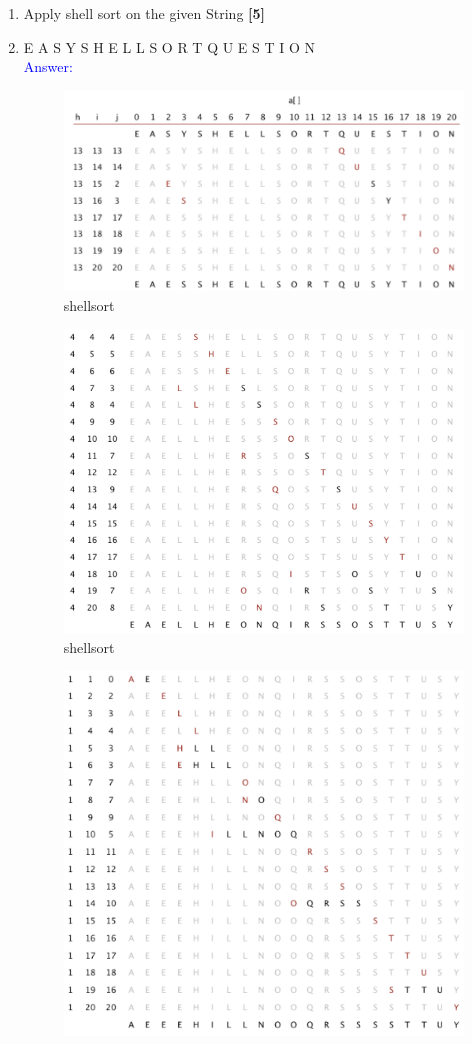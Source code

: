 \documentclass[12pt ,a4paper]{exam}
\begin{document}
	\begin{enumerate}[start=1,label={\bfseries Q\arabic*)}]
	\item Apply shell sort on the given String \hfill\textbf{[5]} 
	\item [] E A S Y S H E L L S O R T Q U E S T I O N\\
	\textcolor{blue}{Answer: }
	\begin{figure}[h]
		\centering
		\includegraphics[width=0.7\linewidth]{"Screenshot 2020-12-26 at 9.42.47 PM"}
		\caption{shellsort}
		\label{fig:screenshot-2020-12-26-at-9}
	\end{figure}
	\begin{figure}[h]
		\centering
		\includegraphics[width=0.7\linewidth]{"Screenshot 2020-12-26 at 9.43.02 PM"}
		\caption{shellsort}
		\label{fig:screenshot-2020-12-26-at-9}
	\end{figure}
	\begin{figure}[h]
		\centering
		\includegraphics[width=0.7\linewidth]{"Screenshot 2020-12-26 at 9.43.23 PM"}

\end{figure}
\end{enumerate}
\end{document}
